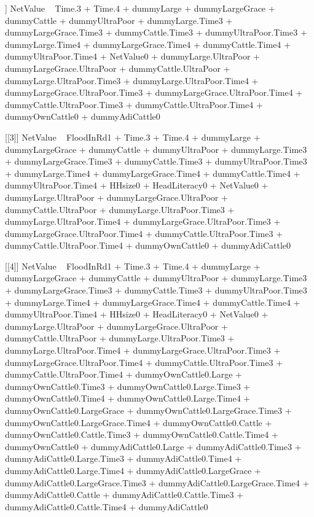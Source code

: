 \begin{Schunk}
\begin{Soutput}
[[2]]
NetValue ~ Time.3 + Time.4 + dummyLarge + dummyLargeGrace + dummyCattle + 
    dummyUltraPoor + dummyLarge.Time3 + dummyLargeGrace.Time3 + 
    dummyCattle.Time3 + dummyUltraPoor.Time3 + dummyLarge.Time4 + 
    dummyLargeGrace.Time4 + dummyCattle.Time4 + dummyUltraPoor.Time4 + 
    NetValue0 + dummyLarge.UltraPoor + dummyLargeGrace.UltraPoor + 
    dummyCattle.UltraPoor + dummyLarge.UltraPoor.Time3 + dummyLarge.UltraPoor.Time4 + 
    dummyLargeGrace.UltraPoor.Time3 + dummyLargeGrace.UltraPoor.Time4 + 
    dummyCattle.UltraPoor.Time3 + dummyCattle.UltraPoor.Time4 + 
    dummyOwnCattle0 + dummyAdiCattle0

[[3]]
NetValue ~ FloodInRd1 + Time.3 + Time.4 + dummyLarge + dummyLargeGrace + 
    dummyCattle + dummyUltraPoor + dummyLarge.Time3 + dummyLargeGrace.Time3 + 
    dummyCattle.Time3 + dummyUltraPoor.Time3 + dummyLarge.Time4 + 
    dummyLargeGrace.Time4 + dummyCattle.Time4 + dummyUltraPoor.Time4 + 
    HHsize0 + HeadLiteracy0 + NetValue0 + dummyLarge.UltraPoor + 
    dummyLargeGrace.UltraPoor + dummyCattle.UltraPoor + dummyLarge.UltraPoor.Time3 + 
    dummyLarge.UltraPoor.Time4 + dummyLargeGrace.UltraPoor.Time3 + 
    dummyLargeGrace.UltraPoor.Time4 + dummyCattle.UltraPoor.Time3 + 
    dummyCattle.UltraPoor.Time4 + dummyOwnCattle0 + dummyAdiCattle0

[[4]]
NetValue ~ FloodInRd1 + Time.3 + Time.4 + dummyLarge + dummyLargeGrace + 
    dummyCattle + dummyUltraPoor + dummyLarge.Time3 + dummyLargeGrace.Time3 + 
    dummyCattle.Time3 + dummyUltraPoor.Time3 + dummyLarge.Time4 + 
    dummyLargeGrace.Time4 + dummyCattle.Time4 + dummyUltraPoor.Time4 + 
    HHsize0 + HeadLiteracy0 + NetValue0 + dummyLarge.UltraPoor + 
    dummyLargeGrace.UltraPoor + dummyCattle.UltraPoor + dummyLarge.UltraPoor.Time3 + 
    dummyLarge.UltraPoor.Time4 + dummyLargeGrace.UltraPoor.Time3 + 
    dummyLargeGrace.UltraPoor.Time4 + dummyCattle.UltraPoor.Time3 + 
    dummyCattle.UltraPoor.Time4 + dummyOwnCattle0.Large + dummyOwnCattle0.Time3 + 
    dummyOwnCattle0.Large.Time3 + dummyOwnCattle0.Time4 + dummyOwnCattle0.Large.Time4 + 
    dummyOwnCattle0.LargeGrace + dummyOwnCattle0.LargeGrace.Time3 + 
    dummyOwnCattle0.LargeGrace.Time4 + dummyOwnCattle0.Cattle + 
    dummyOwnCattle0.Cattle.Time3 + dummyOwnCattle0.Cattle.Time4 + 
    dummyOwnCattle0 + dummyAdiCattle0.Large + dummyAdiCattle0.Time3 + 
    dummyAdiCattle0.Large.Time3 + dummyAdiCattle0.Time4 + dummyAdiCattle0.Large.Time4 + 
    dummyAdiCattle0.LargeGrace + dummyAdiCattle0.LargeGrace.Time3 + 
    dummyAdiCattle0.LargeGrace.Time4 + dummyAdiCattle0.Cattle + 
    dummyAdiCattle0.Cattle.Time3 + dummyAdiCattle0.Cattle.Time4 + 
    dummyAdiCattle0


\end{Soutput}
\end{Schunk}
